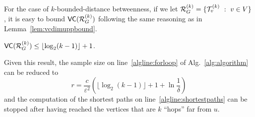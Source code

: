 For the case of $k$-bounded-distance betweenness, if we let
$\mathcal{R}_G^{(k)}=\{\mathcal{T}_v^{(k)}~:~ v\in V\}$, it is easy to bound
$\mathsf{VC}(\mathcal{R}_G^{(k)})$ following the same reasoning as in
Lemma~\ref{lem:vcdimuppbound}.
\begin{lemma}\label{lem:vcdimuppboundk}
$\mathsf{VC}(\mathcal{R}_G^{(k)})\le\lfloor\log_2(k-1)\rfloor+1$.
\end{lemma}

Given this result, the sample size on line~\ref{algline:forloop}
of Alg.~\ref{alg:algorithm} can be reduced to 
\[ 
  r= \frac{c}{\varepsilon^2}\left(\lfloor\log_2(k-1)\rfloor + 1 +\ln\frac{1}{\delta}\right)
\]
and the computation of the shortest paths on line~\ref{algline:shortestpaths}
can be stopped after having reached the vertices that are $k$ ``hops'' far from $u$.

%
%

